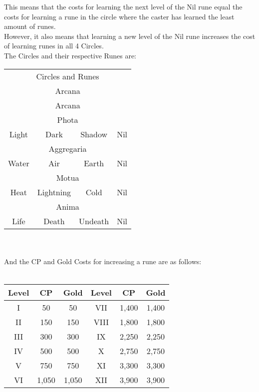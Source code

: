 This means that the costs for learning the next level of the Nil rune equal the costs for learning a rune in the circle where the caster has learned the least amount of runes.\\

However, it also means that learning a new level of the Nil rune increases the cost of learning runes in all 4 Circles.\\

The Circles and their respective Runes are:

\begin{tabular}{c | c | c | c}
	\multicolumn{4}{c}{Circles and Runes}\\
	\multicolumn{4}{c}{Arcana} \\
	\multicolumn{4}{c}{Arcana} \\
	\hline
	\hline
	\multicolumn{4}{c}{Phota}\\
	Light & Dark & Shadow & Nil\\
	\hline
	\hline
	\multicolumn{4}{c}{Aggregaria}\\
	Water & Air & Earth & Nil\\
	\hline
	\hline
	\multicolumn{4}{c}{Motua}\\
	Heat & Lightning & Cold & Nil\\
	\hline
	\hline
	\multicolumn{4}{c}{Anima}\\
	Life & Death & Undeath & Nil\\
\end{tabular}
\\
\\
And the CP and Gold Costs for increasing a rune are as follows:
\\
\\
\begin{tabular}{c | c | c || c | c | c}
	Level & CP & Gold & Level & CP & Gold \\ \hline
	I & 50 & 50 & VII & 1,400 & 1,400 \\
	II & 150 & 150 & VIII & 1,800 & 1,800 \\
	III & 300 & 300 & IX & 2,250 & 2,250 \\
	IV & 500 & 500 & X & 2,750 & 2,750 \\
	V & 750 & 750 & XI & 3,300 & 3,300 \\
	VI & 1,050 & 1,050 & XII & 3,900 & 3,900 \\
\end{tabular}

	
	
